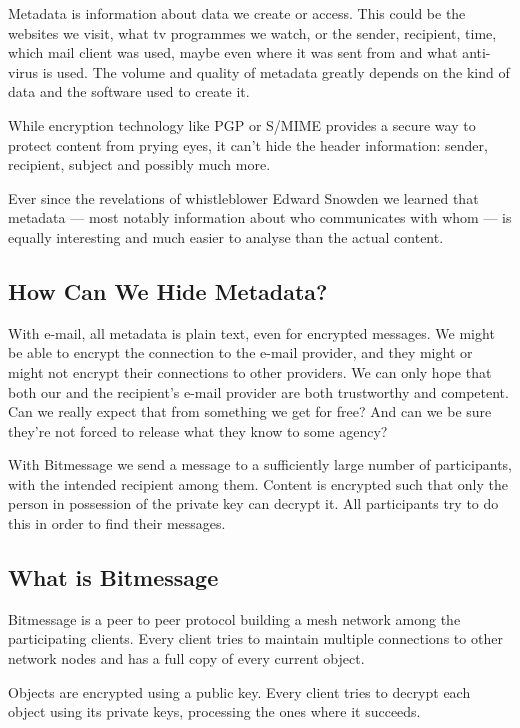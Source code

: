 \documentclass{bfh}
\begin{document}
  Metadata is information about data we create or access. This could be the websites we visit, what tv programmes we watch, or the sender, recipient, time, which mail client was used, maybe even where it was sent from and what anti-virus is used. The volume and quality of metadata greatly depends on the kind of data and the software used to create it.

  While encryption technology like \ac{PGP} or \acs{S/MIME} provides a secure way to protect content from prying eyes, it can't hide the header information: sender, recipient, subject and possibly much more.

  Ever since the revelations of whistleblower Edward Snowden we learned that metadata --- most notably information about who communicates with whom --- is equally interesting and much easier to analyse than the actual content.\cite{guardian:metadata}

  \subsection{How Can We Hide Metadata?}

  With e-mail, all metadata is plain text, even for encrypted messages. We might be able to encrypt the connection to the e-mail provider, and they might or might not encrypt their connections to other providers. We can only hope that both our and the recipient's e-mail provider are both trustworthy and competent. Can we really expect that from something we get for free? And can we be sure they're not forced to release what they know to some agency?\cite{yale:nsl}

  With Bitmessage we send a message to a sufficiently large number of participants, with the intended recipient among them. Content is encrypted such that only the person in possession of the private key can decrypt it. All participants try to do this in order to find their messages.

  \subsection{What is Bitmessage}
  
  Bitmessage is a peer to peer protocol building a mesh network among the participating clients. Every client tries to maintain multiple connections to other network nodes and has a full copy of every current object.
  
  Objects are encrypted using a public key. Every client tries to decrypt each object using its private keys, processing the ones where it succeeds.
\end{document}
